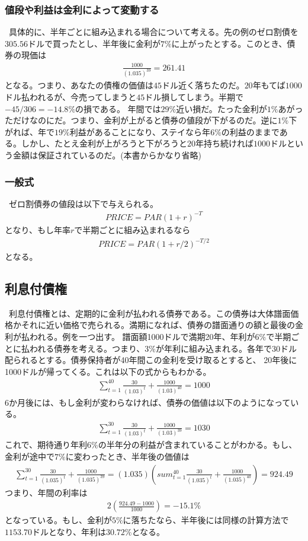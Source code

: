 \documentclass[dvipdfmx,autodetect-engine]{jsarticle}
\begin{document}
\subsubsection{値段や利益は金利によって変動する}
\ 具体的に、半年ごとに組み込まれる場合について考える。先の例のゼロ割債を$305.56$ドルで買ったとし、半年後に金利が$7\%$に上がったとする。このとき、債券の現価は
\begin{align*}
\frac{1000}{(1.035)^{39}} = 261.41
\end{align*}
となる。つまり、あなたの債権の価値は$45$ドル近く落ちたのだ。$20$年もてば$1000$ドル払われるが、今売ってしまうと$45$ドル損してしまう。半期で$-45/306 = -14.8\%$の損である。
年間では$29\%$近い損だ。たった金利が$1\%$あがっただけなのにだ。つまり、金利が上がると債券の値段が下がるのだ。逆に$1\%$下がれば、年で$19\%$利益があることになり、ステイなら年$6\%$の利益のままである。しかし、たとえ金利が上がろうと下がろうと$20$年持ち続ければ$1000$ドルという金額は保証されているのだ。(本書からかなり省略)
\subsubsection{一般式}
\ ゼロ割債券の値段は以下で与えられる。
\begin{align*}
PRICE = PAR(1 + r)^{-T}
\end{align*}
となり、もし年率$r$で半期ごとに組み込まれるなら
\begin{align*}
PRICE = PAR(1 + r/2)^{-T/2}
\end{align*}
となる。
\subsection{利息付債権}
\ 利息付債権とは、定期的に金利が払われる債券である。この債券は大体譜面価格かそれに近い価格で売られる。満期になれば、債券の譜面通りの額と最後の金利が払われる。例を一つ出す。
譜面額1000ドルで満期20年、年利が6$\%$で半期ごとに払われる債券を考える。つまり、$3\%$が年利に組み込まれる。各年で30ドル配られるとする。債券保持者が40年間この金利を受け取るとすると、
20年後に1000ドルが帰ってくる。これは以下の式からもわかる。
\begin{align*}
\sum_{t=1}^{40}\frac{30}{(1.03)^{t}} + \frac{1000}{(1.03)^40} = 1000
\end{align*}
6か月後には、もし金利が変わらなければ、債券の価値は以下のようになっている。
\begin{align*}
\sum_{t=1}^{30}\frac{30}{(1.03)^{t}} + \frac{1000}{(1.03)^39} = 1030
\end{align*}
これで、期待通り年利6$\%$の半年分の利益が含まれていることがわかる。もし、金利が途中で$7\%$に変わったとき、半年後の価値は
\begin{align*}
\sum_{t=1}^{30}\frac{30}{(1.035)^{t}} + \frac{1000}{(1.035)^39} = (1.035)\left(sum_{t=1}^{40}\frac{30}{(1.035)^{t}} + \frac{1000}{(1.035)^40}\right) = 924.49
\end{align*}
つまり、年間の利率は
\begin{align*}
2\left(\frac{924.49 - 1000}{1000}\right) = -15.1\%
\end{align*}
となっている。もし、金利が$5\%$に落ちたなら、半年後には同様の計算方法で$1153.70$ドルとなり、年利は$30.72\%$となる。
\end{document}
